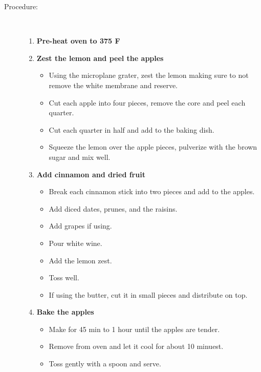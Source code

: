 \documentclass[11pt,letterpaper]{article}
\begin{document}
\begin{description}
\item[Procedure:]\ \\
	\begin{enumerate}	
	\item {\bf Pre-heat oven to 375 F}
	\item {\bf Zest the lemon and peel the apples}
	\begin{itemize}
	\item Using the microplane grater, zest the lemon making sure to not remove the white membrane and reserve.
	\item Cut each apple into four pieces, remove the core and peel each quarter. 
	\item Cut each quarter in half and add to the baking dish.
	\item Squeeze the lemon over the apple pieces, pulverize with the brown sugar and mix well.
	\end{itemize}
	\item {\bf Add cinnamon and dried fruit}
	\begin{itemize}
	\item Break each cinnamon stick into two pieces and add to the apples.
	\item Add diced dates, prunes, and the raisins. 
	\item Add grapes if using.
	\item Pour white wine.
	\item Add the lemon zest.
	\item Toss well.
	\item If using the butter, cut it in small pieces and distribute on top.
	\end{itemize}
	\item {\bf Bake the apples}
	\begin{itemize}
	\item Make for 45 min to 1 hour until the apples are tender.
	\item Remove from oven and let it cool for about 10 minuest.
	\item Toss gently with a spoon and serve.
	\end{itemize}
	\end{enumerate}
\end{description}
\end{document}
